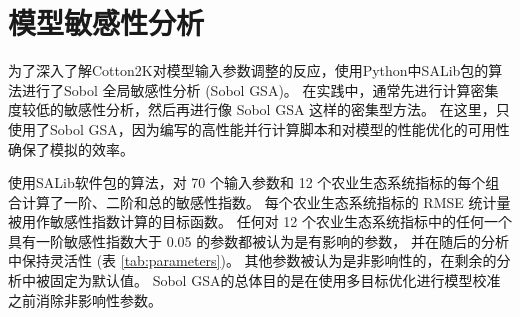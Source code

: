 \chapter{模型敏感性分析}\label{chap:sa}
\begin{spacing}{}
    为了深入了解Cotton2K对模型输入参数调整的反应，使用Python中SALib包的算法进行了Sobol 全局敏感性分析 (Sobol GSA)。%
    在实践中，通常先进行计算密集度较低的敏感性分析，然后再进行像 Sobol GSA 这样的密集型方法。%
    在这里，只使用了Sobol GSA，因为编写的高性能并行计算脚本和对模型的性能优化的可用性确保了模拟的效率。

    使用SALib软件包的算法，对 70 个输入参数和 12 个农业生态系统指标的每个组合计算了一阶、二阶和总的敏感性指数。%
    每个农业生态系统指标的 RMSE 统计量被用作敏感性指数计算的目标函数。%
    任何对 12 个农业生态系统指标中的任何一个具有一阶敏感性指数大于 0.05 的参数都被认为是有影响的参数，%
    并在随后的分析中保持灵活性 (表 \ref{tab:parameters})。%
    其他参数被认为是非影响性的，在剩余的分析中被固定为默认值。%
    Sobol GSA的总体目的是在使用多目标优化进行模型校准之前消除非影响性参数。

\end{spacing}
